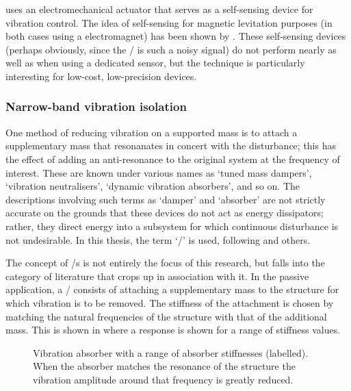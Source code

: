 \textcite{paulitsch2003} uses an electromechanical actuator that serves as a self-sensing device for vibration control.
The idea of self-sensing for magnetic levitation purposes (in both cases using a electromagnet) has been shown by \textcite{bleuler1992,vischer1993}.
These self-sensing devices (perhaps obviously, since the \backemf/ is such a noisy signal) do not perform nearly as well as when using a dedicated sensor, but the technique is particularly interesting for low-cost, low-precision devices.


\subsubsection{Narrow-band vibration isolation}

One method of reducing vibration on a supported mass is to attach a supplementary mass that resonanates in concert with the disturbance; this has the effect of adding an anti-resonance to the original system at the frequency of interest.
These are known under various names as `tuned mass dampers', `vibration neutralisers', `dynamic vibration absorbers', and so on.
The descriptions involving such terms as `damper' and `absorber' are not strictly accurate on the grounds that these devices do not act as energy dissipators; rather, they direct energy into a subsystem for which continuous disturbance is not undesirable.
In this thesis, the term `\vibneut/' is used, following \textcite{kidner1998} and others.

The concept of \vibneut/s is not entirely the focus of this research, but falls into the category of literature that crops up in association with it.
In the passive application, a \vibneut/ consists of attaching a supplementary mass to the structure for which vibration is to be removed.
The stiffness of the attachment is chosen by matching the natural frequencies of the structure with that of the additional mass.
This is shown in  where a response is shown for a range of stiffness values.

\begin{figure}
   \caption{
     Vibration absorber with a range of absorber stiffnesses (labelled).
     When the absorber matches the resonance of the structure the vibration amplitude around that frequency is greatly reduced.}
\end{figure}

